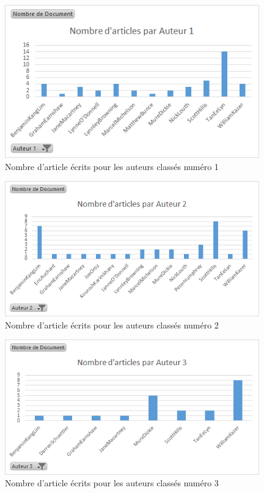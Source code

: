 \documentclass[a4paper,12pt]{report}
\begin{document}
\begin{figure}[H]
\centering
\includegraphics[width=11cm]{fig/Auteur1.png}
\caption{Nombre d'article écrits pour les auteurs classés numéro 1}
\label{auteur1}
\end{figure}

\begin{figure}[H]
\centering
\includegraphics[width=11cm]{fig/Auteur2.png}
\caption{Nombre d'article écrits pour les auteurs classés numéro 2}
\label{auteur2}
\end{figure}

\begin{figure}[H]
\centering
\includegraphics[width=11cm]{fig/Auteur3.png}
\caption{Nombre d'article écrits pour les auteurs classés numéro 3}
\label{auteur3}
\end{figure}
\end{document}
